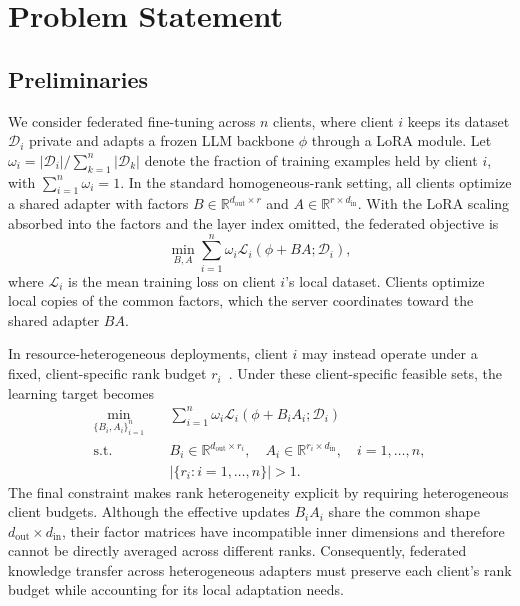 \section{Problem Statement}
\label{sec:problem}

\subsection{Preliminaries}

We consider federated fine-tuning across $n$ clients, where client $i$ keeps its dataset $\mathcal{D}_i$ private and adapts a frozen LLM backbone $\phi$ through a LoRA module.
Let $\omega_i=|\mathcal{D}_i|/\sum_{k=1}^{n}|\mathcal{D}_k|$ denote the fraction of training examples held by client $i$, with $\sum_{i=1}^{n}\omega_i=1$.
In the standard homogeneous-rank setting, all clients optimize a shared adapter with factors $B\in\mathbb{R}^{d_{\mathrm{out}}\times r}$ and $A\in\mathbb{R}^{r\times d_{\mathrm{in}}}$.
With the LoRA scaling absorbed into the factors and the layer index omitted, the federated objective is
\begin{equation}
    \min_{B,A}
    \sum_{i=1}^{n}\omega_i
    \mathcal{L}_i\!\left(\phi+BA;\mathcal{D}_i\right),
    \label{equ:objective}
\end{equation}
where $\mathcal{L}_i$ is the mean training loss on client $i$'s local dataset.
Clients optimize local copies of the common factors, which the server coordinates toward the shared adapter $BA$.


In resource-heterogeneous deployments, client $i$ may instead operate under a fixed, client-specific rank budget $r_i$~\cite{bai2024flexlora,wang2024flora,cho2024hetlora}.
Under these client-specific feasible sets, the learning target becomes
\begin{equation}
    \begin{aligned}
        \min_{\{B_i,A_i\}_{i=1}^{n}}\quad
        &\sum_{i=1}^{n}\omega_i
        \mathcal{L}_i\!\left(\phi+B_iA_i;\mathcal{D}_i\right) \\
        \text{s.t.}\quad
        &B_i\in\mathbb{R}^{d_{\mathrm{out}}\times r_i},\quad
        A_i\in\mathbb{R}^{r_i\times d_{\mathrm{in}}},\quad i=1,\ldots,n,\\
        &\left|\{r_i:i=1,\ldots,n\}\right|>1.
    \end{aligned}
    \label{equ:heterogeneous-objective}
\end{equation}
The final constraint makes rank heterogeneity explicit by requiring heterogeneous client budgets.
Although the effective updates $B_iA_i$ share the common shape $d_{\mathrm{out}}\times d_{\mathrm{in}}$, their factor matrices have incompatible inner dimensions and therefore cannot be directly averaged across different ranks.
Consequently, federated knowledge transfer across heterogeneous adapters must preserve each client's rank budget while accounting for its local adaptation needs.

